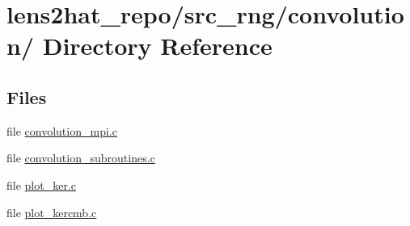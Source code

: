 \section{lens2hat\-\_\-repo/src\-\_\-rng/convolution/ Directory Reference}
\label{dir_37b90dd4c1aa120b15927da5e6db5faa}
\subsection*{Files}
\begin{DoxyCompactItemize}
\item 
file \hyperlink{convolution__mpi_8c}{convolution\-\_\-mpi.\-c}
\item 
file \hyperlink{convolution__subroutines_8c}{convolution\-\_\-subroutines.\-c}
\item 
file \hyperlink{plot__ker_8c}{plot\-\_\-ker.\-c}
\item 
file \hyperlink{plot__kercmb_8c}{plot\-\_\-kercmb.\-c}
\end{DoxyCompactItemize}
